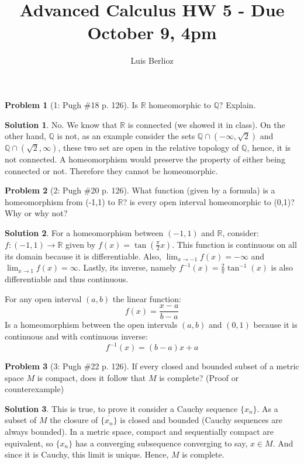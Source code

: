 \documentclass{article}
\theoremstyle{definition}
\newtheorem*{soln}{Solution}
\newtheorem*{prob}{Problem}
\theoremstyle{theorem}
\newcommand{\R}{\mathbb{R}}
\newcommand{\Q}{\mathbb{Q}}
\begin{document}
\title{Advanced Calculus HW 5 - Due October 9, 4pm}
\author{Luis Berlioz}
\maketitle




\begin{prob}[1: Pugh \#18 p. 126]
Is $\R$ homeomorphic to $\Q$? Explain.
\end{prob}
\begin{soln}
    No. We know that $\R$ is connected (we showed it in class). On the other hand, $\Q$ is not, as an example consider the sets $\Q\cap (-\infty, \sqrt 2)$ and $\Q\cap(\sqrt 2, \infty)$, these two set are open in the relative topology of $\Q$, hence, it is not connected. A homeomorphism would preserve the property of either being connected or not. Therefore they cannot be homeomorphic.
\end{soln}
\vspace{1in}


\begin{prob}[2: Pugh \#20 p. 126]
    What function (given by a formula) is a homeomorphism from (-1,1) to $\R$? is every open interval homeomorphic to (0,1)? Why or why not?
\end{prob}
\begin{soln}
    For a homeomorphism between $(-1, 1)$ and $\R$, consider:  $f: (-1,1) \to \R$ given by $f(x) = \tan(\frac\pi2 x)$. This function is continuous on all its domain because it is differentiable. Also, $\lim_{x\to -1 }f(x) = -\infty$ and $\lim_{x\to 1 }f(x) = \infty$. Lastly, its inverse, namely $f^{-1 }(x) = \frac 2\pi \tan^{-1 }(x)$ is also differentiable and thus continuous. 

    For any open interval $(a,b)$ the linear function:
    $$f(x) = \frac{x-a}{b-a}$$  
    Is a homeomorphism between the open intervals $(a,b)$ and $(0,1)$ because it is continuous and with continuous inverse:
    $$f^{-1 }(x) = (b-a)x + a$$
\end{soln}
\vspace{1in}


\begin{prob}[3: Pugh \#22 p. 126]
    If every closed and bounded subset of a metric space $M$ is compact, does it follow that $M$ is complete? (Proof or counterexample)
\end{prob}
\begin{soln}
    This is true, to prove it consider a Cauchy sequence $\{x_n  \}$. As a subset of $M$ the closure of $\overline{\{x_n  \}}$ is closed and bounded (Cauchy sequences are always bounded). In a metric space, compact and sequentially compact are equivalent, so $\{x_n  \}$ has a converging subsequence converging to say, $x\in M$. And since it is Cauchy, this limit is unique. Hence, $M$ is complete.
\end{soln}
\vspace{1in}
\end{document}
